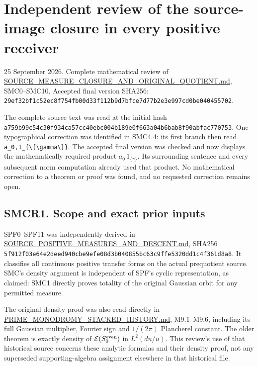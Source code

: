 \section{Independent review of the source-image closure in every
positive
receiver}\label{independent-review-of-the-source-image-closure-in-every-positive-receiver}

25 September 2026. Complete mathematical review of
\href{https://github.com/KokunoYumeto/zeta-function-research-reader/blob/main/workbenches/splitzero-tandem/continuations/20260925-full-source-tensor-and-original-divisor/identity/SOURCE_MEASURE_CLOSURE_AND_ORIGINAL_QUOTIENT.md}{SOURCE\_MEASURE\_CLOSURE\_AND\_ORIGINAL\_QUOTIENT.md},
SMC0--SMC10. Accepted final version SHA256:
\texttt{29ef32bf1c52ec8f754fb00d33f112b9d7bfce7d77b2e3e997cd0be040455702}.

The complete source text was read at the initial hash
\texttt{a759b99c54c30f934ca57cc40ebc004b189e0f663a04b6bab8f90abfac770753}.
One typographical correction was identified in SMC4.4: its first branch
then read
\texttt{a\_0,1\_\{\textbackslash{}\{\textbackslash{}gamma\textbackslash{}\}\}}.
The accepted final version was checked and now displays the
mathematically required product \(a_0\,1_{\{\gamma\}}\). Its surrounding
sentence and every subsequent norm computation already used that
product. No mathematical correction to a theorem or proof was found, and
no requested correction remains open.

\subsection{SMCR1. Scope and exact prior
inputs}\label{smcr1.-scope-and-exact-prior-inputs}

SPF0--SPF11 was independently derived in
\href{https://github.com/KokunoYumeto/zeta-function-research-reader/blob/main/workbenches/splitzero-tandem/continuations/20260925-full-source-tensor-and-original-divisor/identity/SOURCE_POSITIVE_MEASURES_AND_DESCENT.md}{SOURCE\_POSITIVE\_MEASURES\_AND\_DESCENT.md},
SHA256
\texttt{5f912f03e64e2deed940cbe9efe08d3b040855bc63c9ffe5320dd1c4f361d8a8}.
It classifies all continuous positive transfer forms on the actual
prequotient source. SMC's density argument is independent of SPF's
cyclic representation, as claimed: SMC1 directly proves totality of the
original Gaussian orbit for any permitted measure.

The original density proof was also read directly in
\href{https://github.com/KokunoYumeto/zeta-function-research-reader/blob/main/workbenches/splitzero-tandem/continuations/20260925-full-source-tensor-and-original-divisor/identity/PRIME_MONODROMY_STACKED_HISTORY.md}{PRIME\_MONODROMY\_STACKED\_HISTORY.md},
M9.1--M9.6, including its full Gaussian multiplier, Fourier sign and
\(1/(2\pi)\) Plancherel constant. The older theorem is exactly density
of \(\mathcal E(S_0^{\rm even})\) in \(L^2(du/u)\). This review's use of
that historical source concerns these analytic formulas and their
density proof, not any superseded supporting-algebra assignment
elsewhere in that historical file.


